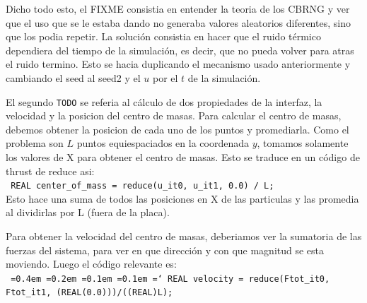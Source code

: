 Dicho todo esto, el FIXME consistia en entender la teoria de los CBRNG y ver que el uso que se le estaba dando
no generaba valores aleatorios diferentes, sino que los podia repetir. La soluci\'on consistia en hacer que el ruido
t\'ermico dependiera del tiempo de la simulaci\'on, es decir, que no pueda volver para atras el ruido termino.
Esto se hacia duplicando el mecanismo usado anteriormente y cambiando el seed al seed2 y el $u$ por el $t$ de la simulaci\'on.


El segundo \texttt{TODO} se referia al c\'alculo de dos propiedades de la interfaz, la velocidad y la posicion del centro de masas.
Para calcular el centro de masas, debemos obtener la posicion de cada uno de los
puntos y promediarla. Como el problema son $L$ puntos equiespaciados en la coordenada $y$, tomamos solamente los valores 
de X para obtener el centro de masas. Esto se traduce en un c\'odigo de thrust de reduce asi: \\
\texttt{ REAL center\_of\_mass = reduce(u\_it0, u\_it1, 0.0) / L;}\\
Esto hace una suma de todos las posiciones en X de las particulas y las promedia al dividirlas por L (fuera de la placa).

Para obtener la velocidad del centro de masas, deberiamos ver la sumatoria de las fuerzas del sistema, para ver en que
direcci\'on y con que magnitud se esta moviendo. Luego el c\'odigo relevante es:\\
\newcommand*\justify{%
  \fontdimen2\font=0.4em%
  \fontdimen3\font=0.2em%
  \fontdimen4\font=0.1em%
  \fontdimen7\font=0.1em%
  \hyphenchar\font=`\-%
}
\texttt{\justify{REAL velocity = reduce(Ftot\_it0, Ftot\_it1, (REAL(0.0)))/((REAL)L);
                             }}\\
